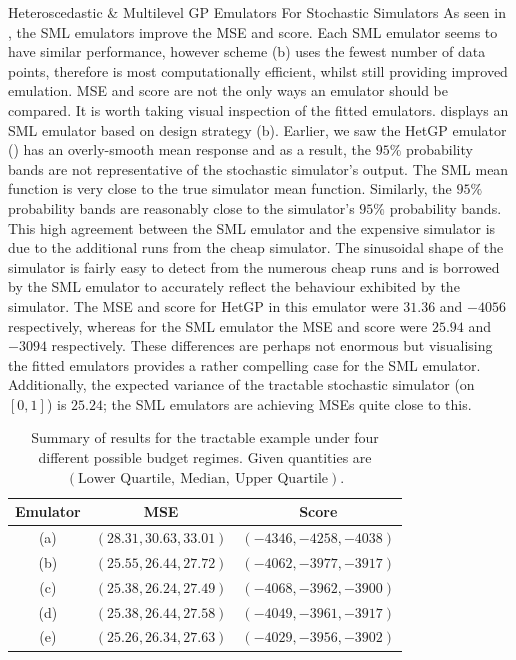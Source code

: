 \begin{chapter}{Heteroscedastic \& Multilevel GP Emulators For Stochastic Simulators\label{Ch:Hetsml}}
As seen in , the SML emulators improve the MSE and score. Each SML emulator seems to have similar performance, however scheme (b) uses the fewest number of data points, therefore is most computationally efficient, whilst still providing improved emulation. MSE and score are not the only ways an emulator should be compared. It is worth taking visual inspection of the fitted emulators.  displays an SML emulator based on design strategy (b). Earlier, we saw the HetGP emulator () has an overly-smooth mean response and as a result, the $95\%$ probability bands are not representative of the stochastic simulator's output. The SML mean function is very close to the true simulator mean function. Similarly, the $95\%$ probability bands are reasonably close to the simulator's $95\%$ probability bands. This high agreement between the SML emulator and the expensive simulator is due to the additional runs from the cheap simulator. The sinusoidal shape of the simulator is fairly easy to detect from the numerous cheap runs and is borrowed by the SML emulator to accurately reflect the behaviour exhibited by the simulator. The MSE and score for HetGP in this emulator were $31.36$ and $-4056$ respectively, whereas for the SML emulator the MSE and score were $25.94$ and $-3094$ respectively. These differences are perhaps not enormous but visualising the fitted emulators provides a rather compelling case for the SML emulator. Additionally, the expected variance of the tractable stochastic simulator (on $[0,1]$) is $25.24$; the SML emulators are achieving MSEs quite close to this.
\begin{table}[h]
	\centering

\begin{tabular}{@{}ccc@{}}
    \toprule
    Emulator & MSE                     & Score \\
    \midrule
    (a)      & $(28.31, 30.63, 33.01)$ & $(-4346, -4258, -4038)$ \\
    (b)      & $(25.55, 26.44, 27.72)$ & $(-4062, -3977, -3917)$ \\
    (c)      & $(25.38, 26.24, 27.49)$ & $(-4068, -3962, -3900)$ \\
    (d)      & $(25.38, 26.44, 27.58)$ & $(-4049, -3961, -3917)$ \\
    (e)      & $(25.26, 26.34, 27.63)$ & $(-4029, -3956, -3902)$ \\
    \bottomrule
  \end{tabular}
	\caption{Summary of results for the tractable example under four different possible budget regimes. Given quantities are $(\text{Lower Quartile},~\text{Median},~\text{Upper Quartile})$.}
\label{Table:toy-results}


\end{table}
\end{chapter}

